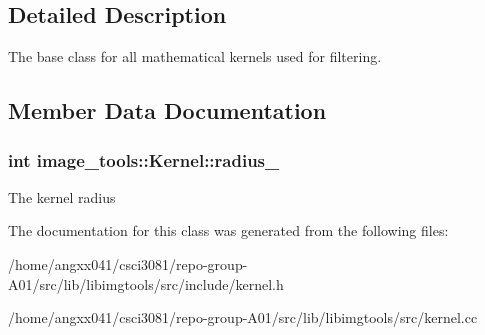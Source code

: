 \subsection{Detailed Description}
The base class for all mathematical kernels used for filtering. 

\subsection{Member Data Documentation}
\subsubsection[{\texorpdfstring{radius\+\_\+}{radius_}}]{\setlength{\rightskip}{0pt plus 5cm}int image\+\_\+tools\+::\+Kernel\+::radius\+\_\+\hspace{0.3cm}{\ttfamily [private]}}\hypertarget{classimage__tools_1_1Kernel_a75493a8e73d0217897d83da1ad30cc82}{}\label{classimage__tools_1_1Kernel_a75493a8e73d0217897d83da1ad30cc82}
The kernel radius 

The documentation for this class was generated from the following files\+:\begin{DoxyCompactItemize}
\item 
/home/angxx041/csci3081/repo-\/group-\/\+A01/src/lib/libimgtools/src/include/kernel.\+h\item 
/home/angxx041/csci3081/repo-\/group-\/\+A01/src/lib/libimgtools/src/kernel.\+cc\end{DoxyCompactItemize}
